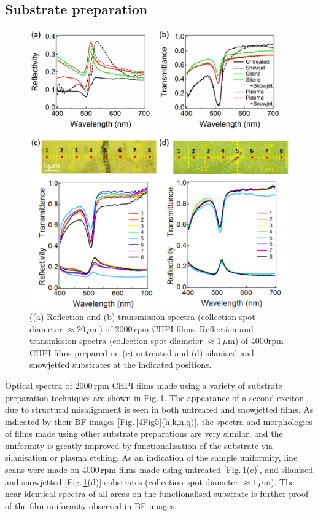 \subsection{Substrate preparation}
\begin{figure}[] 
\centering    
\includegraphics[width=\textwidth]{Fig7}
\caption{((a) Reflection and (b) transmission spectra (collection spot diameter $\approx 20\,\mu$m) of 2000\,rpm CHPI films. Reflection and transmission spectra (collection spot diameter $\approx1\,\mu$m) of 4000rpm CHPI films prepared on (c) untreated and (d) silanised and snowjetted substrates at the indicated positions.}
\label{4Fig7}
\end{figure}
Optical spectra of 2000\,rpm CHPI films made using a variety of substrate preparation techniques are shown in Fig.\,\ref{4Fig7}. The appearance of a second exciton due to structural misalignment is seen in both untreated and snowjetted films. As indicated by their BF images [Fig.\,\ref{4Fig5}(h,k,n,q)], the spectra and morphologies of films made using other substrate preparations are very similar, and the uniformity is greatly improved by functionalisation of the substrate via silanisation or plasma etching. As an indication of the sample uniformity, line scans were made on 4000\,rpm films made using untreated [Fig.\,\ref{4Fig7}(c)], and silanised and snowjetted [Fig.\,\ref{4Fig7}(d)] substrates (collection spot diameter $\approx1\,\mu$m). The near-identical spectra of all areas on the functionalised substrate is further proof of the film uniformity observed in BF images.

